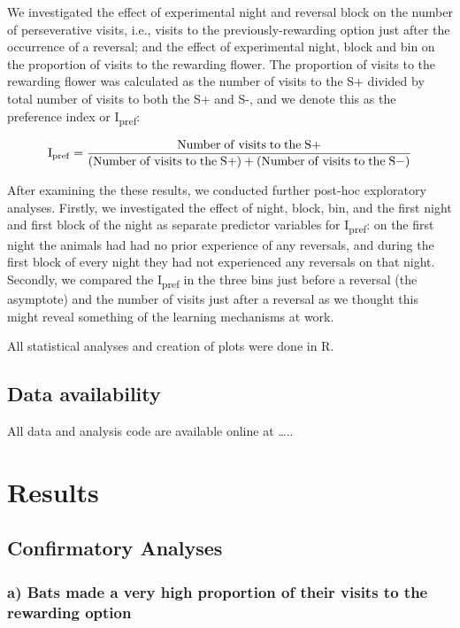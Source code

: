 \documentclass[
]{article}
\begin{document}
We investigated the effect of experimental night and reversal block on the number of perseverative visits, i.e., visits to the previously-rewarding option just after the occurrence of a reversal; and the effect of experimental night, block and bin on the proportion of visits to the rewarding flower. The proportion of visits to the rewarding flower was calculated as the number of visits to the S+ divided by total number of visits to both the S+ and S-, and we denote this as the preference index or I\textsubscript{pref}:

\[\mathrm{I_{pref}} = \displaystyle \frac{\rm Number \;of\; visits\; to\; the\; S+}{\rm (Number \;of\; visits\; to\; the\; S+) + (\rm Number \;of\; visits\; to\; the\; S-)}\]

After examining the these results, we conducted further post-hoc exploratory analyses. Firstly, we investigated the effect of night, block, bin, and the first night and first block of the night as separate predictor variables for I\textsubscript{pref}: on the first night the animals had had no prior experience of any reversals, and during the first block of every night they had not experienced any reversals on that night. Secondly, we compared the I\textsubscript{pref} in the three bins just before a reversal (the asymptote) and the number of visits just after a reversal as we thought this might reveal something of the learning mechanisms at work.

All statistical analyses and creation of plots were done in R.

\hypertarget{data-availability}{%
\subsection{Data availability}\label{data-availability}}

All data and analysis code are available online at \ldots..

\hypertarget{results}{%
\section{Results}\label{results}}

\hypertarget{confirmatory-analyses}{%
\subsection{Confirmatory Analyses}\label{confirmatory-analyses}}

\hypertarget{a-bats-made-a-very-high-proportion-of-their-visits-to-the-rewarding-option}{%
\subsubsection{a) Bats made a very high proportion of their visits to the rewarding option}\label{a-bats-made-a-very-high-proportion-of-their-visits-to-the-rewarding-option}}
\end{document}
